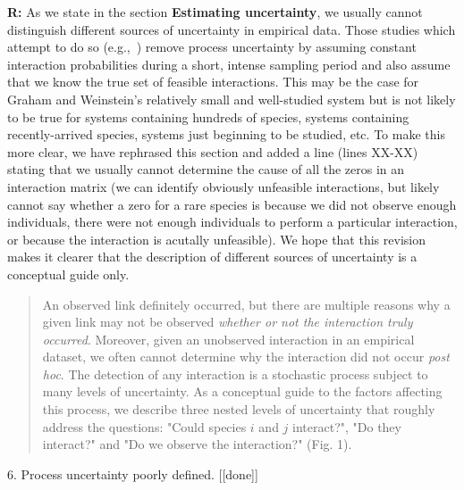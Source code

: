 \documentclass[12pt]{letter}
\begin{document}
\begin{itemize}
		\textbf{R:} As we state in the section \textbf{Estimating uncertainty}, we usually cannot distinguish different sources of uncertainty in empirical data. Those studies which attempt to do so (e.g.,~\citet{Graham2018}) remove process uncertainty by assuming constant interaction probabilities during a short, intense sampling period and also assume that we know the true set of feasible interactions. This may be the case for Graham and Weinstein's relatively small and well-studied system but is not likely to be true for systems containing hundreds of species, systems containing recently-arrived species, systems just beginning to be studied, etc.
		\smallskip
		To make this more clear, we have rephrased this section and added a line (lines XX-XX) stating that we usually cannot determine the cause of all the zeros in an interaction matrix (we can identify obviously unfeasible interactions, but likely cannot say whether a zero for a rare species is because we did not observe enough individuals, there were not enough individuals to perform a particular interaction, or because the interaction is acutally unfeasible). We hope that this revision makes it clearer that the description of different sources of uncertainty is a conceptual guide only.


		\begin{quotation}
			An observed link definitely occurred, but there are multiple reasons why a given link may not be observed \emph{whether or not the interaction truly occurred}. Moreover, given an unobserved interaction in an empirical dataset, we often cannot determine why the interaction did not occur \emph{post hoc}. The detection of any interaction is a stochastic process subject to many levels of uncertainty. As a conceptual guide to the factors affecting this process, we describe three nested levels of uncertainty that roughly address the questions: "Could species $i$ and $j$ interact?", "Do they interact?" and "Do we observe the interaction?" (Fig. 1). 
		\end{quotation}


	6. Process uncertainty poorly defined. [[done]]


\end{itemize}
\end{document}
